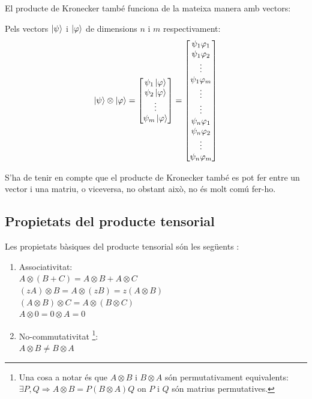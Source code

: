 El producte de Kronecker també funciona de la mateixa manera amb vectors:

Pels vectors $\ket{\psi}$ i $\ket{\varphi}$ de dimensions $n$ i $m$ respectivament:
$$
\ket{\psi} \otimes \ket{\varphi} = \begin{bmatrix}
	\psi_{1} \ket{\varphi} \\
	\psi_2 \ket{\varphi} \\
	\vdots \\
	\psi_{m} \ket{\varphi}
\end{bmatrix} = 
\begin{bmatrix}
\psi_{1} \varphi_1 \\
\psi_{1} \varphi_{2} \\
\vdots \\
\psi_{1} \varphi_{m} \\
\vdots \\
\vdots \\
\psi_{n} \varphi_1 \\
\psi_{n} \varphi_{2} \\
\vdots \\
\psi_{n} \varphi_{m} \\
\end{bmatrix}
$$

S'ha de tenir en compte que el producte de Kronecker també es pot fer entre un vector i una matriu, o viceversa, no obstant això, no és molt comú fer-ho.

\subsection{Propietats del producte tensorial}
Les propietats bàsiques del producte tensorial són les següents \cite{QCandQI:tensor_product, wiki:tensor_product}:
\begin{enumerate}
	\item Associativitat: \\ $A \otimes (B + C) = A \otimes B + A \otimes C$ \\
	$ (zA) \otimes B = A \otimes (zB) = z(A \otimes B)$\\
	$ (A \otimes B) \otimes C = A \otimes (B\otimes C)$ \\
	$A \otimes 0 = 0 \otimes A = 0 $
	\item No-commutativitat \footnote{Una cosa a notar és que $A \otimes B$ i $B \otimes A$ són 
	permutativament equivalents: \\ $\exists P, Q \Rightarrow A \otimes B = P (  B \otimes A )Q$ on $P$ i $Q$ són matrius permutatives.  }: \\
	$A \otimes B \neq B \otimes A $
\end{enumerate}



